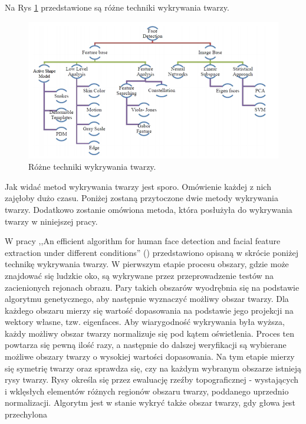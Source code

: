 \documentclass[a4paper,twoside,12pt]{book}
\begin{document}
    Na Rys \ref{fig.technikiWykrywaniaTwarzy} przedstawione są różne techniki wykrywania twarzy.
    \begin{figure}
        \centering
        \includegraphics[width=15cm]{Obrazy/technikiWykrywaniaTwarzy.jpg}
        \caption{Różne techniki wykrywania twarzy. \cite{faceDetectionTechniques}}
        \label{fig.technikiWykrywaniaTwarzy}
    \end{figure}


    Jak widać metod wykrywania twarzy jest sporo.
    Omówienie każdej z nich zajęłoby dużo czasu.
    Poniżej zostaną przytoczone dwie metody wykrywania twarzy.
    Dodatkowo zostanie omówiona metoda, która posłużyła do wykrywania twarzy w niniejszej pracy.

    W pracy ,,An efficient algorithm for human face detection and facial
    feature extraction under different conditions'' (\cite{wongLamSiu})
    przedstawiono opisaną w skrócie poniżej technikę wykrywania twarzy.
    W pierwszym etapie procesu obszary, gdzie może znajdować się ludzkie oko,
    są wykrywane przez przeprowadzenie testów na zacienionych rejonach obrazu.
    Pary takich obszarów wyodrębnia się na podstawie algorytmu genetycznego,
    aby następnie wyznaczyć możliwy obszar twarzy.
    Dla każdego obszaru mierzy się wartość dopasowania na podstawie jego projekcji na wektory własne,
    tzw. eigenfaces.
    Aby wiarygodność wykrywania była wyższa,
    każdy możliwy obszar twarzy normalizuje się pod kątem oświetlenia.
    Proces ten powtarza się pewną ilość razy,
    a następnie do dalszej weryfikacji są wybierane możliwe obszary twarzy o wysokiej wartości dopasowania.
    Na tym etapie mierzy się symetrię twarzy oraz sprawdza się,
    czy na każdym wybranym obszarze istnieją rysy twarzy.
    Rysy określa się przez ewaluację rzeźby topograficznej - wystających i wklęsłych elementów
    różnych regionów obszaru twarzy, poddanego uprzednio normalizacji.
    Algorytm jest w stanie wykryć także obszar twarzy, gdy głowa jest przechylona
\end{document}
